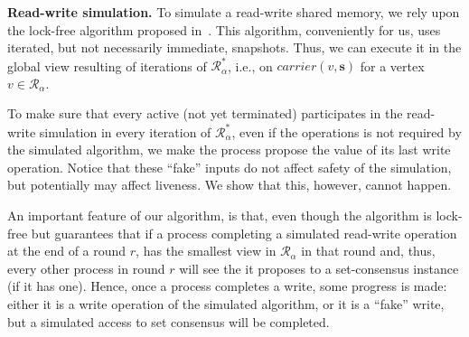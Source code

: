 \documentclass[a4paper]{article}
\newcommand{\myparagraph}[1]{\vspace{6pt}\noindent \textbf{#1}}
\def\R{\ensuremath{\mathcal{R}}}
\def\s {\mathbf{s}}
\def\Car{\mathit{carrier}}
\newcommand{\pknote}[1]{\textbf{PK: #1}}
\begin{document}
%

\myparagraph{Read-write simulation.} 
To simulate a read-write shared memory, we rely upon  
the lock-free algorithm proposed in~\cite{GR10-opodis}.
%
This algorithm, conveniently for us, uses iterated, but not necessarily immediate,
snapshots.
%
Thus, we can execute it in the global view resulting of 
iterations of $\R_\alpha^*$, i.e., on $\Car(v,\s)$ for a vertex
$v\in\R_\alpha$. %

To make sure that every active (not yet terminated) participates in
the read-write simulation in every iteration of $\R_{\alpha}^*$, even if the
operations is not required by the simulated algorithm, we make the
process propose the value of its last write operation.
Notice that these ``fake'' inputs do not affect safety of the
simulation, but potentially may affect liveness.
We show that this, however, cannot happen.


An important feature of our algorithm, 
is that, even though the algorithm is lock-free but guarantees that 
if a process completing a simulated read-write operation at the end of a round $r$, 
has the smallest view in $\R_\alpha$ in that round and, thus, every
other process in round $r$ will see the it proposes to a set-consensus instance (if it has one). 
%
Hence,  once a process completes a write, some progress is made:
either it is a write operation of the simulated algorithm, or it is a
``fake'' write, but a simulated access to set
consensus will be completed.      
\end{document}
